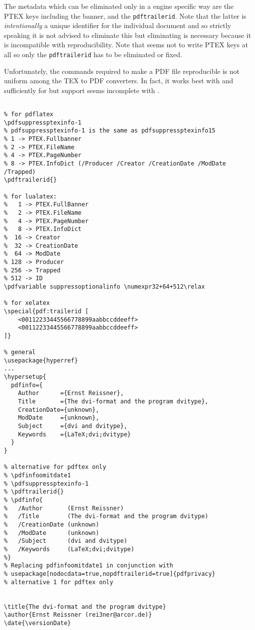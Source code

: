 The metadata which can be eliminated only in a engine specific way 
are the PTEX keys including the banner, and the \texttt{pdftrailerid}. 
Note that the latter is \emph{intentionally} 
a unique identifier for the individual document 
and so strictly speaking it is not advised to eliminate this 
but eliminating is necessary because it is incompatible with reproducibility. 
Note that \xelatex{} seems not to write PTEX keys at all 
so only the \texttt{pdftrailerid} has to be eliminated or fixed. 

Unfortunately, the commands required to make a PDF file reproducible 
is not uniform among the TEX to PDF converters. 
In fact, it works best with \lualatex{} and sufficiently for \pdflatex{} 
but support seems incomplete with \xelatex. 


\begin{lstlisting}[language={[LaTeX]TeX}, basicstyle=\tiny,
  escapechar=|,
  float, captionpos=b, label={lst:designMeta}, 
  caption={Specifying meta-data for PDF files}]

% for pdflatex
\pdfsuppressptexinfo-1
% pdfsuppressptexinfo-1 is the same as pdfsuppressptexinfo15
% 1 -> PTEX.Fullbanner
% 2 -> PTEX.FileName
% 4 -> PTEX.PageNumber
% 8 -> PTEX.InfoDict (/Producer /Creator /CreationDate /ModDate /Trapped)
\pdftrailerid{}

% for lualatex: 
%   1 -> PTEX.FullBanner
%   2 -> PTEX.FileName
%   4 -> PTEX.PageNumber
%   8 -> PTEX.InfoDict
%  16 -> Creator
%  32 -> CreationDate
%  64 -> ModDate
% 128 -> Producer
% 256 -> Trapped
% 512 -> ID
\pdfvariable suppressoptionalinfo \numexpr32+64+512\relax

% for xelatex
\special{pdf:trailerid [
    <00112233445566778899aabbccddeeff>
    <00112233445566778899aabbccddeeff>
]}

% general
\usepackage{hyperref}
...
\hypersetup{
  pdfinfo={
    Author      ={Ernst Reissner},
    Title       ={The dvi-format and the program dvitype},
    CreationDate={unknown},
    ModDate     ={unknown},
    Subject     ={dvi and dvitype},
    Keywords    ={LaTeX;dvi;dvitype}
  }
}

% alternative for pdftex only
% \pdfinfoomitdate1
% \pdfsuppressptexinfo-1
% \pdftrailerid{}
% \pdfinfo{
%   /Author       (Ernst Reissner)
%   /Title        (The dvi-format and the program dvitype)
%   /CreationDate (unknown)
%   /ModDate      (unknown)
%   /Subject      (dvi and dvitype)
%   /Keywords     (LaTeX;dvi;dvitype)
%}
% Replacing pdfinfoomitdate1 in conjunction with
% usepackage[nodocdata=true,nopdftrailerid=true]{pdfprivacy}
% alternative 1 for pdftex only


\title{The dvi-format and the program dvitype}
\author{Ernst Reissner (rei3ner@arcor.de)}
\date{\versionDate}
\end{lstlisting}



